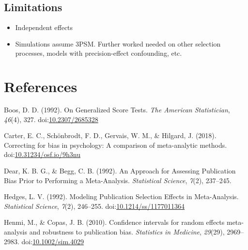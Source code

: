 \documentclass[man,floatsintext]{apa6}
\providecommand{\tightlist}{%
  \setlength{\itemsep}{0pt}\setlength{\parskip}{0pt}}
\begin{document}
\hypertarget{limitations}{%
\subsection{Limitations}\label{limitations}}

\begin{itemize}
\tightlist
\item
  Independent effects
\item
  Simulations assume 3PSM. Further worked needed on other selection processes, models with precision-effect confounding, etc.
\end{itemize}

\newpage

\hypertarget{references}{%
\section{References}\label{references}}

\begingroup
\setlength{\parindent}{-0.5in}
\setlength{\leftskip}{0.5in}

\hypertarget{refs}{}
\leavevmode\hypertarget{ref-boos1992GeneralizedScoreTests}{}%
Boos, D. D. (1992). On Generalized Score Tests. \emph{The American Statistician}, \emph{46}(4), 327. doi:\href{https://doi.org/10.2307/2685328}{10.2307/2685328}

\leavevmode\hypertarget{ref-carter2018CorrectingBiasPsychology}{}%
Carter, E. C., Schönbrodt, F. D., Gervais, W. M., \& Hilgard, J. (2018). Correcting for bias in psychology: A comparison of meta-analytic methods. doi:\href{https://doi.org/10.31234/osf.io/9h3nu}{10.31234/osf.io/9h3nu}

\leavevmode\hypertarget{ref-dear1992ApproachAssessingPublication}{}%
Dear, K. B. G., \& Begg, C. B. (1992). An Approach for Assessing Publication Bias Prior to Performing a Meta-Analysis. \emph{Statistical Science}, \emph{7}(2), 237--245.

\leavevmode\hypertarget{ref-hedges1992ModelingPublicationSelection}{}%
Hedges, L. V. (1992). Modeling Publication Selection Effects in Meta-Analysis. \emph{Statistical Science}, \emph{7}(2), 246--255. doi:\href{https://doi.org/10.1214/ss/1177011364}{10.1214/ss/1177011364}

\leavevmode\hypertarget{ref-henmi2010ConfidenceIntervalsRandom}{}%
Henmi, M., \& Copas, J. B. (2010). Confidence intervals for random effects meta-analysis and robustness to publication bias. \emph{Statistics in Medicine}, \emph{29}(29), 2969--2983. doi:\href{https://doi.org/10.1002/sim.4029}{10.1002/sim.4029}
\end{document}
